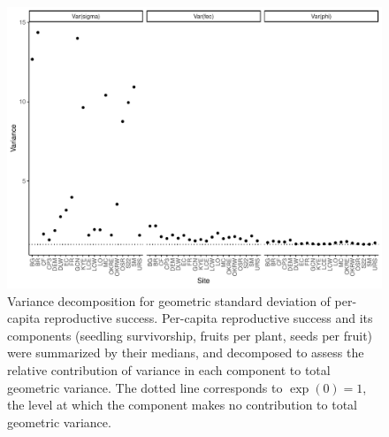 \documentclass[12pt, oneside, titlepage]{article}   	%
\begin{document}
{\begin{figure}[!h]
       \includegraphics[width=\textwidth]{../figures/analysis/variance-decomp.pdf}  
    \caption{ Variance decomposition for geometric standard deviation of per-capita reproductive success. Per-capita reproductive success and its components (seedling survivorship, fruits per plant, seeds per fruit) were summarized by their medians, and decomposed to assess the relative contribution of variance in each component to total geometric variance. The dotted line corresponds to $\exp(0)=1$, the level at which the component makes no contribution to total geometric variance. }
\end{figure}

}
\end{document}
